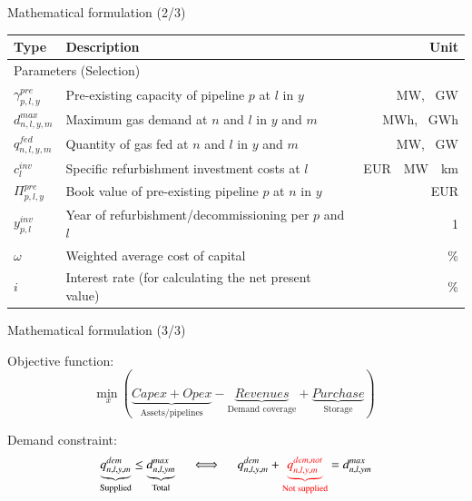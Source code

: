 \documentclass[aspectratio=169]{beamer}
\begin{document}
\begin{frame}{Mathematical formulation (2/3)}
	\begin{center}
		\vspace{-0.75cm}
		\renewcommand{\arraystretch}{1.2}
		\centering
		\small
		\begin{tabular}{lm{7.75cm}r}
			Type & Description & Unit\\
			\hline
			\multicolumn{2}{l}{Parameters (Selection)}\\
			\hline
			{$\gamma^{pre}_{p,l,y}$} & Pre-existing capacity of pipeline $p$ at $l$ in $y$ & \SI{}{MW}, \SI{}{GW}\\
			{$d^{max}_{n,l,y,m}$} & Maximum gas demand at $n$ and $l$ in $y$ and $m$ & \SI{}{MWh}, \SI{}{GWh}\\
			{$q^{fed}_{n,l,y,m}$} & Quantity of gas fed at $n$ and $l$ in $y$ and $m$ & \SI{}{MW}, \SI{}{GW}\\
			{$c^{inv}_{l}$} & Specific refurbishment investment costs at $l$  & \SI{}{EUR \per MW \per km}\\
			{$\Pi^{pre}_{p,l,y}$} & Book value of pre-existing pipeline $p$ at $n$ in $y$& \SI{}{EUR}\\
			{$y^{inv}_{p,l}$} & Year of refurbishment/decommissioning per $p$ and $l$ & \SI{1}{}\\
			{$\omega$} & Weighted average cost of capital & \SI{}{\%}\\
			{$i$} & Interest rate (for calculating the net present value) & \SI{}{\%}\\
			\hline
		\end{tabular}
	\end{center}
\end{frame}

\begin{frame}{Mathematical formulation (3/3)}
	\begin{block}{Objective function:}
		$$\underset{x}{\mathrm{min~}} \left(
		\underbrace{Capex + Opex}_{\text{Assets/pipelines}} - \underbrace{Revenues}_{\text{Demand coverage}} +  \underbrace{Purchase}_{\text{Storage}}\right) $$
	\end{block}
	\begin{block}{Demand constraint:}
		$$
		\underbrace{q^{dem}_{n,l,y,m}}_{\text{Supplied}} \leq \underbrace{d^{max}_{n,l,ym}}_{\text{Total}} \quad\iff\quad \textcolor{black}{q^{dem}_{n,l,y,m}} + \textcolor{red}{\underbrace{q^{dem,not}_{n,l,y,m}}_{\text{Not supplied}}} = d^{max}_{n,l,ym}
		$$
	\end{block}
\end{frame}
\end{document}

